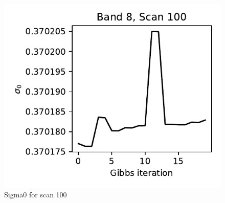 \documentclass{aa}
\begin{document}
\begin{figure}
	\centering
	\includegraphics[width=\columnwidth]{figs/sigma0_trace.pdf}
	\caption{Sigma0 for scan 100}
	\label{fig:sigma0_band8}
\end{figure}
\end{document}
